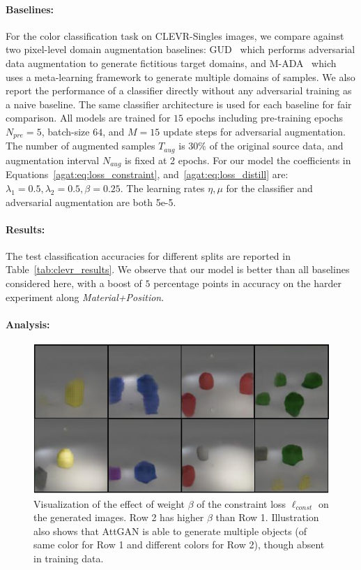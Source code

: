     \paragraph{Baselines:}
    For the color classification task on CLEVR-Singles images, we compare against two pixel-level domain augmentation baselines: GUD~\citep{volpi2018generalizing} which performs adversarial data augmentation to generate fictitious target domains, and M-ADA~\citep{qiao2020learning} which uses a meta-learning framework to generate multiple domains of samples.
    We also report the performance of a classifier directly without any adversarial training as a naive baseline.
    The same classifier architecture is used for each baseline for fair comparison.
    All models are trained for $15$ epochs including pre-training epochs $N_{pre}=5$, batch-size $64$, and $M=15$ update steps for adversarial augmentation.
    The number of augmented samples $T_{aug}$ is $30\%$ of the original source data, and augmentation interval $N_{aug}$ is fixed at 2 epochs.
    For our model the coefficients in Equations~\ref{agat:eq:loss_constraint}, and~\ref{agat:eq:loss_distill} are: $\lambda_1=0.5, \lambda_2=0.5, \beta=0.25$.
    The learning rates $\eta, \mu$ for the classifier and adversarial augmentation are both 5e-5. %

    \paragraph{Results:}
    
    The test classification accuracies for different splits are reported in Table~\ref{tab:clevr_results}. 
    We observe that our model is better than all baselines considered here, with a boost of $5$ percentage points in accuracy on the harder experiment along \textit{Material+Position}.
    


    \paragraph{Analysis:}
    \begin{figure}[t]
        \centering
        \includegraphics[width=0.58\linewidth]{agat/images/clevr_beta_viz.png}
        \caption{Visualization of the effect of weight $\beta$ of the constraint loss $\ell_{const}$ on the generated images. Row 2 has higher $\beta$ than Row 1. Illustration also shows that AttGAN is able to generate multiple objects (of same color for Row 1 and different colors for Row 2), though absent in training data.
        }
        \label{fig:clevr_novel_viz}
    \end{figure}
    

